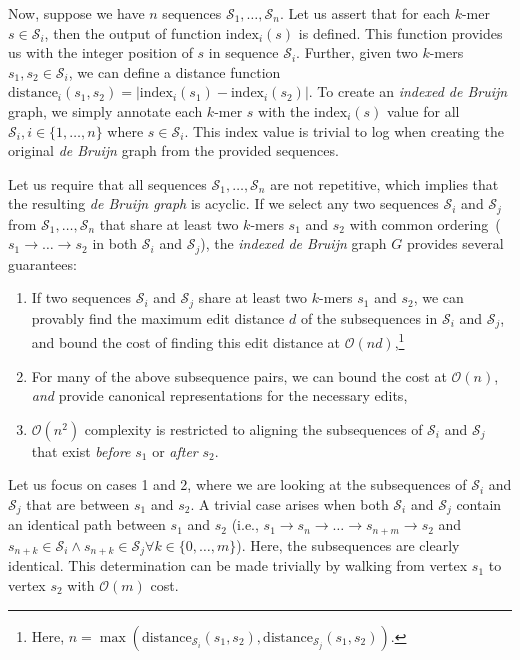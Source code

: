 \documentclass[11pt]{article}
\begin{document}
Now, suppose we have $n$ sequences $\mathcal{S}_1, \dots, \mathcal{S}_n$. Let us assert that for each
$k$-mer $s \in \mathcal{S}_i$, then the output of function $\text{index}_i(s)$ is defined. This function
provides us with the integer position of $s$ in sequence $\mathcal{S}_i$. Further, given two $k$-mers
$s_1, s_2 \in \mathcal{S}_i$, we can define a distance function
$\text{distance}_i(s_1, s_2) = | \text{index}_i(s_1) - \text{index}_i(s_2) |$. To create an \emph{indexed
de Bruijn} graph, we simply annotate each $k$-mer $s$ with the $\text{index}_i(s)$ value for all
$\mathcal{S}_i, i \in \{1, \dots, n\}$ where $s \in \mathcal{S}_i$. This index value is trivial to log when
creating the original \emph{de Bruijn} graph from the provided sequences.

Let us require that all sequences $\mathcal{S}_1, \dots, \mathcal{S}_n$ are not repetitive, which implies
that the resulting \emph{de Bruijn graph} is acyclic. If we select any two sequences $\mathcal{S}_i$ and
$\mathcal{S}_j$ from $\mathcal{S}_1, \dots, \mathcal{S}_n$ that share at least two $k$-mers $s_1$ and
$s_2$ with common ordering~($s_1 \rightarrow \dots \rightarrow s_2$ in both $\mathcal{S}_i$ and
$\mathcal{S}_j$), the \emph{indexed de Bruijn} graph $G$ provides several guarantees:

\begin{enumerate}
\item If two sequences $\mathcal{S}_i$ and $\mathcal{S}_j$ share at least two $k$-mers $s_1$ and
$s_2$, we can provably find the maximum edit distance $d$ of the subsequences in $\mathcal{S}_i$ and
$\mathcal{S}_j$, and bound the cost of finding this edit distance at $\mathcal{O}(nd)$,\footnote{Here,
$n = \max(\text{distance}_{\mathcal{S}_i}(s_1, s_2), \text{distance}_{\mathcal{S}_j}(s_1, s_2))$.}
\item For many of the above subsequence pairs, we can bound the cost at $\mathcal{O}(n)$, \emph{and}
provide canonical representations for the necessary edits,
\item $\mathcal{O}(n^2)$ complexity is restricted to aligning the subsequences of $\mathcal{S}_i$ and
$\mathcal{S}_j$ that exist \emph{before} $s_1$ or \emph{after} $s_2$.
\end{enumerate}

Let us focus on cases 1 and 2, where we are looking at the subsequences of $\mathcal{S}_i$ and
$\mathcal{S}_j$ that are between $s_1$ and $s_2$. A trivial case arises when both $\mathcal{S}_i$ and
$\mathcal{S}_j$ contain an identical path between $s_1$ and $s_2$ (i.e.,
$s_1 \rightarrow s_n \rightarrow \dots \rightarrow s_{n + m} \rightarrow s_2$ and
$s_{n + k} \in \mathcal{S}_i \wedge s_{n + k} \in \mathcal{S}_j \forall k \in \{0, \dots , m\}$). Here, the
subsequences are clearly identical. This determination can be made trivially by walking from vertex $s_1$
to vertex $s_2$ with $\mathcal{O}(m)$ cost.
\end{document}
